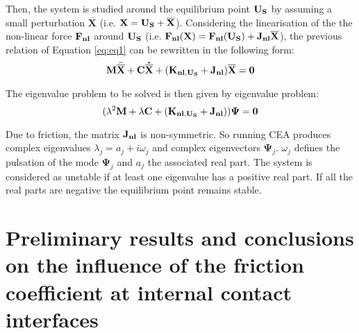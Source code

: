 \documentclass[final,1p]{elsarticle}
\begin{document}
Then, the system is studied around the equilibrium point $\bf{U_S}$ by assuming a small perturbation $\overline{\textbf{X}}$  (i.e. $\bf{X} = \bf{U_S} + \overline{\bf{X}}$). Considering the linearisation of the the non-linear force $\bf{F}_{nl}$ around $\bf{U}_S$ 
(i.e. $\bf{F_{nl}(\bf{X}) = \textbf{F}_{nl}(\bf{U}_S) + \bf{J}_{nl} \overline{\bf{X}} }$), the previous relation of Equation \ref{eq:eq1} can be rewritten in the following form:
\begin{equation}
\textbf{M} \ddot{\overline{\bf{X}}} + \bf{C} \dot{\overline{\bf{X}}} + (\bf{K_{nl,\bf{U}_S}} + \bf{J}_{nl})\overline{\textbf{X}} = \bf{0}
\label{aq:eq4}
\end{equation}

The eigenvalue problem to be solved is then given by  eigenvalue problem:
\begin{equation}
(\lambda^2  \bf{M} + \lambda \textbf{C} + (\bf{K_{nl,\bf{U}_S}}+ \bf{J}_{nl}))\boldsymbol{\Psi} = \bf{0}
\end{equation}

Due to friction, the matrix $\bf{J_{nl}}$ is non-symmetric. So running CEA produces complex eigenvalues $\lambda_j= a_j + i\omega_j$ and complex eigenvectors $\boldsymbol{\Psi}_j$. $\omega_j$ defines the pulsation of the mode $\boldsymbol{\Psi}_j$ and $a_j$ the associated real part. The system is considered as unstable if at least one eigenvalue has a positive real part. If all the real parts are negative  the equilibrium point remains stable.



\section{Preliminary results and conclusions on the influence of the friction coefficient at internal contact interfaces}
\label{subsec:InfluenceInternalContacts}
\end{document}
